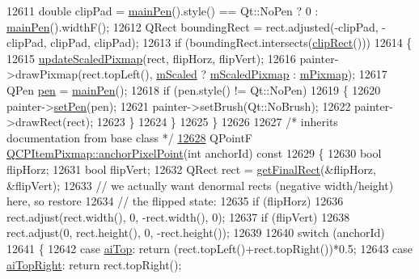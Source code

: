\begin{DoxyCode}
12611   \textcolor{keywordtype}{double} clipPad = \hyperlink{a00037_af21085516585c475dc9d839e7f377233}{mainPen}().style() == Qt::NoPen ? 0 : \hyperlink{a00037_af21085516585c475dc9d839e7f377233}{mainPen}().widthF();
12612   QRect boundingRect = rect.adjusted(-clipPad, -clipPad, clipPad, clipPad);
12613   \textcolor{keywordflow}{if} (boundingRect.intersects(\hyperlink{a00022_a538e25ff8856534582f5b2b400a46405}{clipRect}()))
12614   \{
12615     \hyperlink{a00037_a8bced3027b326b290726cd1979c7cfc6}{updateScaledPixmap}(rect, flipHorz, flipVert);
12616     painter->drawPixmap(rect.topLeft(), \hyperlink{a00037_a8fe670a529cd46a9b8afd9fc1203bc3f}{mScaled} ? \hyperlink{a00037_a2ebc66e15b9f1264563d58f29ba1bc00}{mScaledPixmap} : 
      \hyperlink{a00037_a1396cce7f26c7b8e9512906284380c4d}{mPixmap});
12617     QPen \hyperlink{a00037_ab2b821c80cfade589472e933b9c4361f}{pen} = \hyperlink{a00037_af21085516585c475dc9d839e7f377233}{mainPen}();
12618     \textcolor{keywordflow}{if} (pen.style() != Qt::NoPen)
12619     \{
12620       painter->\hyperlink{a00047_af9c7a4cd1791403901f8c5b82a150195}{setPen}(pen);
12621       painter->setBrush(Qt::NoBrush);
12622       painter->drawRect(rect);
12623     \}
12624   \}
12625 \}
12626 
12627 \textcolor{comment}{/* inherits documentation from base class */}
\hypertarget{a00115_source_l12628}{}\hyperlink{a00037_a88abce3c1027f371cddcf6dad35ffbb1}{12628} QPointF \hyperlink{a00037_a88abce3c1027f371cddcf6dad35ffbb1}{QCPItemPixmap::anchorPixelPoint}(\textcolor{keywordtype}{int} anchorId)\textcolor{keyword}{ const}
12629 \textcolor{keyword}{}\{
12630   \textcolor{keywordtype}{bool} flipHorz;
12631   \textcolor{keywordtype}{bool} flipVert;
12632   QRect rect = \hyperlink{a00037_a245ef0c626cab7096a810442f2f6a2d9}{getFinalRect}(&flipHorz, &flipVert);
12633   \textcolor{comment}{// we actually want denormal rects (negative width/height) here, so restore}
12634   \textcolor{comment}{// the flipped state:}
12635   \textcolor{keywordflow}{if} (flipHorz)
12636     rect.adjust(rect.width(), 0, -rect.width(), 0);
12637   \textcolor{keywordflow}{if} (flipVert)
12638     rect.adjust(0, rect.height(), 0, -rect.height());
12639   
12640   \textcolor{keywordflow}{switch} (anchorId)
12641   \{
12642     \textcolor{keywordflow}{case} \hyperlink{a00037_a0ea7f65edb7395e02de521915f221174a90e523ebaed7921ca90cf1b08944ece5}{aiTop}:         \textcolor{keywordflow}{return} (rect.topLeft()+rect.topRight())*0.5;
12643     \textcolor{keywordflow}{case} \hyperlink{a00037_a0ea7f65edb7395e02de521915f221174a33c256cdec46fa1587534fcd6e776799}{aiTopRight}:    \textcolor{keywordflow}{return} rect.topRight();

\end{DoxyCode}
